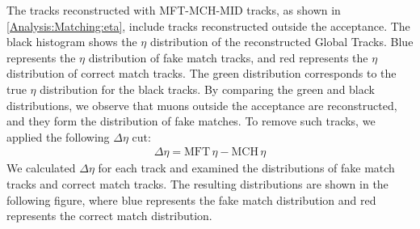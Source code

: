                 The tracks reconstructed with MFT-MCH-MID tracks, as shown in \ref{Analysis:Matching:eta}, include tracks reconstructed outside the acceptance. The black histogram shows the $\eta$ distribution of the reconstructed Global Tracks. Blue represents the $\eta$ distribution of fake match tracks, and red represents the $\eta$ distribution of correct match tracks. The green distribution corresponds to the true $\eta$ distribution for the black tracks. By comparing the green and black distributions, we observe that muons outside the acceptance are reconstructed, and they form the distribution of fake matches. 
                To remove such tracks, we applied the following $\Delta \eta$ cut:
                \begin{eqnarray}
                    \Delta \eta = \text{MFT} \, \eta - \text{MCH} \, \eta  
                \end{eqnarray}
                We calculated $\Delta \eta$ for each track and examined the distributions of fake match tracks and correct match tracks. The resulting distributions are shown in the following figure, where blue represents the fake match distribution and red represents the correct match distribution.
